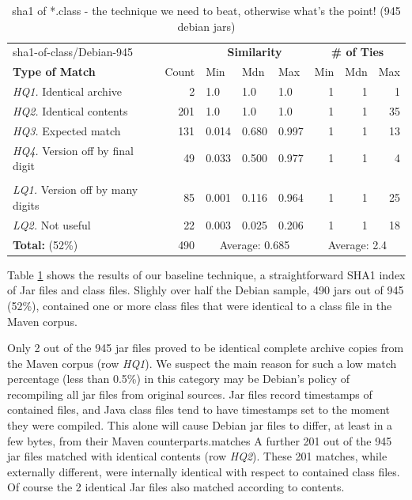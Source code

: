 \begin{table}[h]
  \centering
\begin{tabular}[htbp]{l|r|lll|rrr}
  sha1-of-class/Debian-945   &              & \multicolumn{3}{c|}{\textbf{Similarity}}  & \multicolumn{3}{c}{\textbf{\# of Ties}} \\
  \textbf{Type of Match}     & Count        & Min   & Mdn    & Max   & Min  & Mdn  & Max  \\
\hline
  \emph{HQ1.} Identical archive          &   2          & 1.0   & 1.0    & 1.0   & 1    & 1    &  1   \\
  \emph{HQ2.} Identical contents         & 201          & 1.0   & 1.0    & 1.0   & 1    & 1    & 35   \\
  \emph{HQ3.} Expected match             & 131          & 0.014 & 0.680  & 0.997 & 1    & 1    & 13   \\
  \emph{HQ4.} Version off by final digit &  49          & 0.033 & 0.500  & 0.977 & 1    & 1    &  4   \\
  & & & & & & & \\
  \emph{LQ1.} Version off by many digits &  85          & 0.001 & 0.116  & 0.964 & 1    & 1    & 25   \\
  \emph{LQ2.} Not useful                 &  22          & 0.003 & 0.025  & 0.206 & 1    & 1    & 18   \\
\hline
  \textbf{Total:} \hspace{8em} (52\%) & 490   & \multicolumn{3}{c|}{Average: 0.685}  & \multicolumn{3}{c}{Average: 2.4} \\
\end{tabular}
  \caption{sha1 of *.class - the technique we need to beat, otherwise what's the point! (945 debian jars)}
  \label{tab:debianSha1OfClass}
\end{table}


Table \ref{tab:debianSha1OfClass} shows the results of our baseline technique, a straightforward SHA1 index of
Jar files and class files.
Slighly over half the Debian sample, 490 jars out of 945 (52\%), contained one or more class files that were
identical to a class file in the Maven corpus.

Only 2 out of the 945 jar files proved to be identical complete archive copies from the Maven corpus
(row \emph{HQ1}).
We suspect the main reason for such a low match percentage (less than 0.5\%) in this category
may be Debian's policy of recompiling all jar files from original sources.
Jar files record timestamps of contained files, and Java class files tend to have timestamps
set to the moment they were compiled.  This alone will cause Debian jar files
to differ, at least in a few bytes, from their Maven counterparts.matches
A further 201 out of the 945 jar files matched with identical contents (row \emph{HQ2}).
These 201 matches, while externally different, were internally identical with respect to contained class files.
Of course the 2 identical Jar files also matched according to contents.

